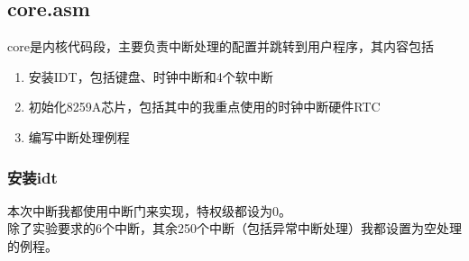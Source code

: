 \documentclass[a4paper,11pt,UTF8]{ctexart}
\begin{document}
	\subsection{core.asm}
	core是内核代码段，主要负责中断处理的配置并跳转到用户程序，其内容包括
	\begin{enumerate}
		\item 安装IDT，包括键盘、时钟中断和4个软中断
		\item 初始化8259A芯片，包括其中的我重点使用的时钟中断硬件RTC
		\item 编写中断处理例程
	\end{enumerate}
	
		\subsubsection{安装idt}
		本次中断我都使用中断门来实现，特权级都设为0。\\
		\indent 除了实验要求的6个中断，其余250个中断（包括异常中断处理）我都设置为空处理的例程。
\end{document}
